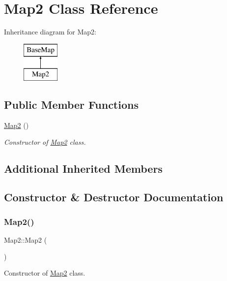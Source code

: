 \hypertarget{class_map2}{}\section{Map2 Class Reference}
\label{class_map2}
Inheritance diagram for Map2\+:\begin{figure}[H]
\begin{center}
\leavevmode
\includegraphics[height=2.000000cm]{class_map2}
\end{center}
\end{figure}
\subsection*{Public Member Functions}
\begin{DoxyCompactItemize}
\item 
\hyperlink{class_map2_a1cb7f3d680636c4d1c66649ff0f88143}{Map2} ()
\begin{DoxyCompactList}\small\item\em Constructor of \hyperlink{class_map2}{Map2} class. \end{DoxyCompactList}\end{DoxyCompactItemize}
\subsection*{Additional Inherited Members}


\subsection{Constructor \& Destructor Documentation}
\mbox{\label{class_map2_a1cb7f3d680636c4d1c66649ff0f88143}} 
\subsubsection{\texorpdfstring{Map2()}{Map2()}}
{\footnotesize\ttfamily Map2\+::\+Map2 (\begin{DoxyParamCaption}{ }\end{DoxyParamCaption})}



Constructor of \hyperlink{class_map2}{Map2} class. 


